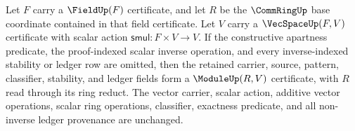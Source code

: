 \begin{proposition}
\label{prop:vecspace-forgets-module-certificate}
Let $F$ carry a $\FieldUp(F)$ certificate, and let $R$ be the $\CommRingUp$ base coordinate contained in that field certificate. Let $V$ carry a $\VecSpaceUp(F,V)$ certificate with scalar action $\mathsf{smul}:F\times V\to V$. If the constructive apartness predicate, the proof-indexed scalar inverse operation, and every inverse-indexed stability or ledger row are omitted, then the retained carrier, source, pattern, classifier, stability, and ledger fields form a $\ModuleUp(R,V)$ certificate, with $R$ read through its ring reduct. The vector carrier, scalar action, additive vector operations, scalar ring operations, classifier, exactness predicate, and all non-inverse ledger provenance are unchanged.
\end{proposition}
